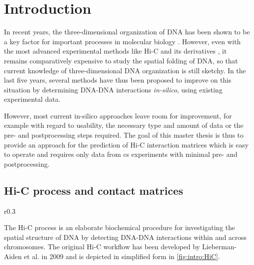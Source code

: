 \section{Introduction}
In recent years, the three-dimensional organization of DNA has been shown to 
be a key factor for important processes in molecular biology \cite{Chathoth2019,Zhang2019b}.
However, even with the most advanced experimental methods like Hi-C and its derivatives \cite{LiebermanAiden2009, Rao2014, Belaghzal2017}, 
it remains comparatively expensive to study the spatial folding of DNA,
so that current knowledge of three-dimensional DNA organization is still sketchy.
In the last five years, several methods have thus been proposed to improve on this situation
by determining DNA-DNA interactions \emph{in-silico}, using existing experimental data.

However, most current in-silico approaches leave room for improvement, for example with regard to usability, the necessary type and amount of data or the pre- and postprocessing steps required.
The goal of this master thesis is thus to provide an approach for the prediction of Hi-C interaction matrices which is easy to operate and requires only data from \acrshort{cs}
experiments with minimal pre- and postprocessing.

\subsection{Hi-C process and contact matrices} \label{sec:intro:hic}
\begin{wrapfigure}[36]{r}{0.3\textwidth}
 \caption{Hi-C lab process}
 \label{fig:intro:HiC}
\end{wrapfigure}
The Hi-C process is an elaborate biochemical procedure for investigating the 
spatial structure of DNA by detecting DNA-DNA interactions within and 
across chromosomes.
The original Hi-C workflow has been developed by Lieberman-Aiden et al. in 2009  \cite{LiebermanAiden2009}
and is depicted in simplified form in \cref{fig:intro:HiC}.

